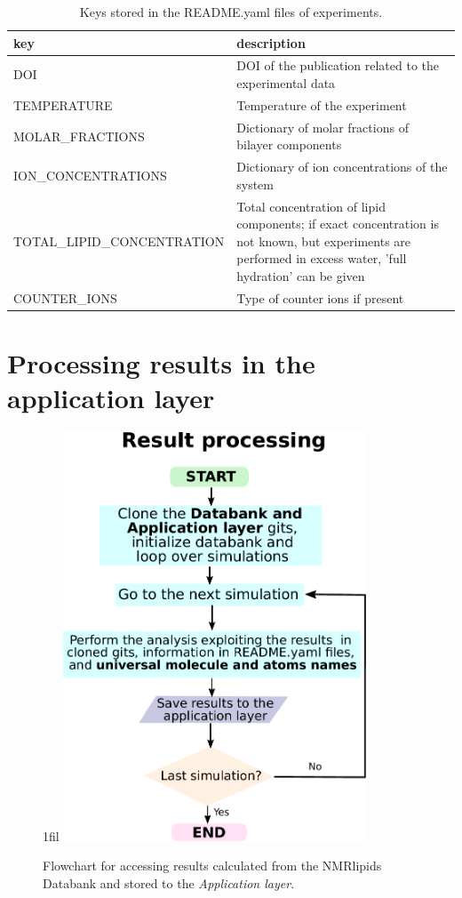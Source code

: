 \documentclass[fleqn,10pt]{wlscirepSI}
\makeatletter
\newcommand*{\centerfloat}{%
  \parindent \z@
  \leftskip \z@ \@plus 1fil \@minus \textwidth
  \rightskip\leftskip
  \parfillskip \z@skip}
\makeatother
\begin{document}
\begin{table}[!h]
    \centering
    \begin{tabular}{  p{5.0cm}  p{10.0cm}}
    \toprule
    key & description \\
    \midrule
    DOI & DOI of the publication related to the experimental data \\
    TEMPERATURE & Temperature of the experiment \\
    MOLAR\_FRACTIONS & Dictionary of molar fractions of bilayer components \\
    ION\_CONCENTRATIONS & Dictionary of ion concentrations of the system \\
    TOTAL\_LIPID\_CONCENTRATION & Total concentration of lipid components; if exact concentration is not known, but experiments are performed in excess water, 'full hydration' can be given \\
    COUNTER\_IONS & Type of counter ions if present
\end{tabular}
    \caption{Keys stored in the README.yaml files of experiments.}
    \label{tab:READMEkeysEXP}
\end{table}



\newpage
\section*{Processing results in the application layer}

\begin{figure}[!h]
    \centerfloat
    \includegraphics[width = 90mm]{Figures/resultProcessing.pdf}
    \caption{Flowchart for accessing results calculated from the NMRlipids Databank and stored to the \textit{Application layer}.}
    \label{fig:resultsProcessingSI}
\end{figure}
\end{document}
